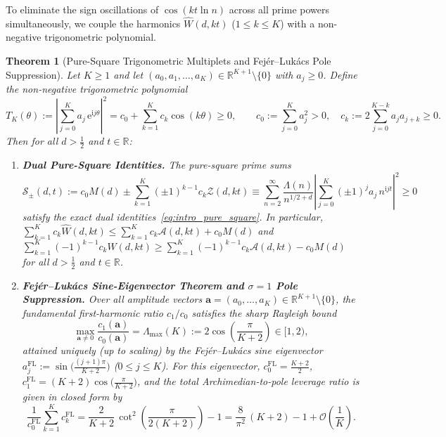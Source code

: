 \documentclass[11pt,reqno]{amsart}
\newtheorem{theorem}{Theorem}[section]
\theoremstyle{definition}
\theoremstyle{remark}
\numberwithin{equation}{section}
\newcommand{\R}{\mathbb{R}}
\newcommand{\ee}{\mathrm{e}}
\newcommand{\ii}{\mathrm{i}}
\begin{document}
To eliminate the sign oscillations of $\cos(kt\ln n)$ across all prime powers simultaneously, we couple the harmonics $\widehat{W}(d,kt)$ ($1 \le k \le K$) with a non-negative trigonometric polynomial.

\begin{theorem}[Pure-Square Trigonometric Multiplets and Fej\'er--Luk\'acs Pole Suppression]\label{thm:pure_square}
Let $K \ge 1$ and let $(a_0, a_1, \dots, a_K) \in \R^{K+1} \setminus \{0\}$ with $a_j \ge 0$. Define the non-negative trigonometric polynomial
\begin{equation}\label{eq:T_K_def}
T_K(\theta) := \left|\sum_{j=0}^K a_j\,\ee^{\ii j\theta}\right|^2 = c_0 + \sum_{k=1}^K c_k\cos(k\theta) \ge 0, \qquad c_0 := \sum_{j=0}^K a_j^2 > 0, \quad c_k := 2\sum_{j=0}^{K-k} a_j a_{j+k} \ge 0.
\end{equation}
Then for all $d > \frac{1}{2}$ and $t \in \R$:
\begin{enumerate}[label=\textup{(\roman*)},leftmargin=2.2em]
\item \textbf{Dual Pure-Square Identities.} The pure-square prime sums
\begin{equation}\label{eq:S_pm_boxed}
\boxed{\mathcal{S}_\pm(d,t) := c_0 M(d) \pm \sum_{k=1}^K (\pm 1)^{k-1} c_k \mathcal{Z}(d,kt) \equiv \sum_{n=2}^{\infty} \frac{\Lambda(n)}{n^{1/2+d}}\left|\sum_{j=0}^K (\pm 1)^j a_j\,n^{\ii j t}\right|^2 \ge 0}
\end{equation}
satisfy the exact dual identities~\eqref{eq:intro_pure_square}. In particular, $\sum_{k=1}^K c_k \widehat{W}(d,kt) \le \sum_{k=1}^K c_k \mathcal{A}(d,kt) + c_0 M(d)$ and $\sum_{k=1}^K (-1)^{k-1} c_k \widehat{W}(d,kt) \ge \sum_{k=1}^K (-1)^{k-1} c_k \mathcal{A}(d,kt) - c_0 M(d)$ for all $d > \frac{1}{2}$ and $t \in \R$.
\item \textbf{Fej\'er--Luk\'acs Sine-Eigenvector Theorem and $\sigma = 1$ Pole Suppression.} Over all amplitude vectors $\mathbf{a} = (a_0, \dots, a_K) \in \R^{K+1} \setminus \{0\}$, the fundamental first-harmonic ratio $c_1/c_0$ satisfies the sharp Rayleigh bound
\begin{equation}\label{eq:fejer_rayleigh}
\max_{\mathbf{a} \neq 0} \frac{c_1(\mathbf{a})}{c_0(\mathbf{a})} = \Lambda_{\max}(K) := 2\cos\!\left(\frac{\pi}{K+2}\right) \in [1, 2),
\end{equation}
attained uniquely (up to scaling) by the Fej\'er--Luk\'acs sine eigenvector $a_j^{\mathrm{FL}} := \sin\bigl(\frac{(j+1)\pi}{K+2}\bigr)$ ($0 \le j \le K$). For this eigenvector, $c_0^{\mathrm{FL}} = \frac{K+2}{2}$, $c_1^{\mathrm{FL}} = (K+2)\cos\bigl(\frac{\pi}{K+2}\bigr)$, and the total Archimedian-to-pole leverage ratio is given in closed form by
\begin{equation}\label{eq:fejer_cot_sum}
\frac{1}{c_0^{\mathrm{FL}}}\sum_{k=1}^K c_k^{\mathrm{FL}} = \frac{2}{K+2}\,\cot^2\!\left(\frac{\pi}{2(K+2)}\right) - 1 = \frac{8}{\pi^2}\,(K+2) - 1 + \mathcal{O}\!\left(\frac{1}{K}\right).
\end{equation}
\end{enumerate}
\end{theorem}
\end{document}
